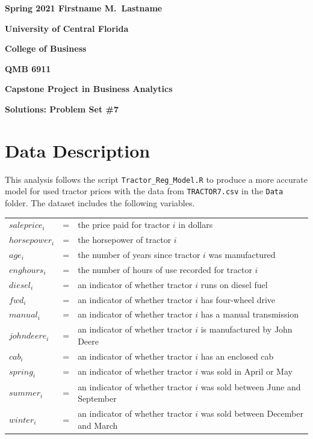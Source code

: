 \documentclass[11pt]{paper}
\begin{document}

\pagestyle{empty}
{\noindent\bf Spring 2021 \hfill Firstname M.~Lastname}
\vskip 16pt
\centerline{\bf University of Central Florida}
\centerline{\bf College of Business}
\vskip 16pt
\centerline{\bf QMB 6911}
\centerline{\bf Capstone Project in Business Analytics}
\vskip 10pt
\centerline{\bf Solutions:  Problem Set \#7}
\vskip 32pt
\noindent

\section{Data Description}

This analysis follows the script \texttt{Tractor\_Reg\_Model.R} to produce a more accurate model for used tractor prices with the data from \texttt{TRACTOR7.csv} in the \texttt{Data} folder. 
The dataset includes the following variables.
\begin{table}[h!]
\begin{tabular}{l l l}

$saleprice_i$ & = & the price paid for tractor $i$ in dollars \\
% 
$horsepower_i$ & = & the horsepower of tractor $i$ \\
$age_i$ & = & the number of years since tractor $i$ was manufactured  \\
$enghours_i$ & = & the number of hours of use recorded for tractor $i$  \\
$diesel_i$ & = & an indicator of whether tractor $i$ runs on diesel fuel \\ %
$fwd_i$ & = & an indicator of whether tractor $i$ has four-wheel drive \\ %
$manual_i$ & = & an indicator of whether tractor $i$ has a manual transmission \\ %
$johndeere_i$ & = & an indicator of whether tractor $i$ is manufactured by John Deere \\ %
$cab_i$ & = & an indicator of whether tractor $i$ has an enclosed cab \\ %
% 
$spring_i$ & = & an indicator of whether tractor $i$ was sold in April or May \\ %
$summer_i$ & = & an indicator of whether tractor $i$ was sold between June and September \\ %
$winter_i$ & = & an indicator of whether tractor $i$ was sold between December and March \\ %

\end{tabular}
\end{table}
%
\end{document}
